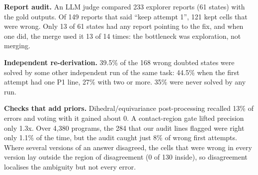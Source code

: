 \textbf{Report audit.} An LLM judge compared 233 explorer reports (61 states) with the gold outputs. Of 149 reports that said ``keep attempt 1'', 121 kept cells that were wrong. Only 13 of 61 states had any report pointing to the fix, and when one did, the merge used it 13 of 14 times: the bottleneck was exploration, not merging.

\textbf{Independent re-derivation.} 39.5\% of the 168 wrong doubted states were solved by some other independent run of the same task: 44.5\% when the first attempt had one P1 line, 27\% with two or more. 35\% were never solved by any run.

\textbf{Checks that add priors.} Dihedral/equivariance post-processing recalled 13\% of errors and voting with it gained about 0. A contact-region gate lifted precision only 1.3x. Over 4,380 programs, the 284 that our audit lines flagged were right only 1.1\% of the time, but the audit caught just 8\% of wrong first attempts. Where several versions of an answer disagreed, the cells that were wrong in every version lay outside the region of disagreement (0 of 130 inside), so disagreement localises the ambiguity but not every error.
